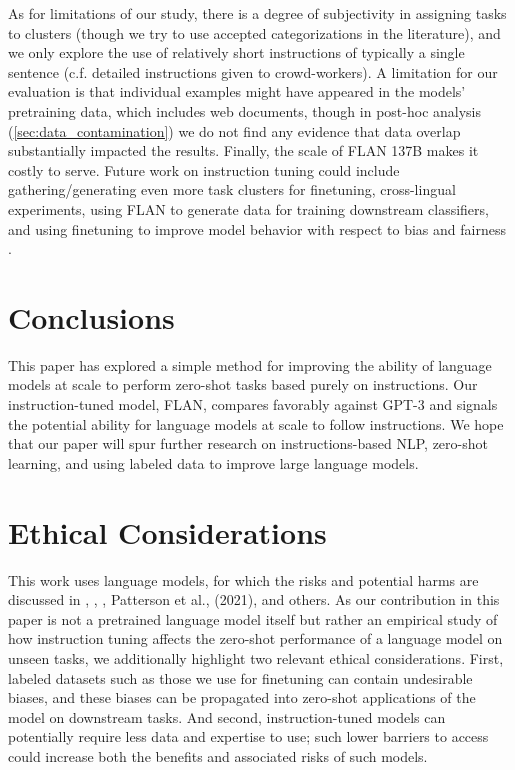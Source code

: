 \documentclass{article} \usepackage{iclr2022_conference,times}
\newcommand{\flan}{FLAN}
\begin{document}
As for limitations of our study, there is a degree of subjectivity in assigning tasks to clusters (though we try to use accepted categorizations in the literature), and we only explore the use of relatively short instructions of typically a single sentence (c.f. detailed instructions given to crowd-workers). 
A limitation for our evaluation is that individual examples might have appeared in the models’ pretraining data, which includes web documents, though in post-hoc analysis (\cref{sec:data_contamination}) we do not find any evidence that data overlap substantially impacted the results.
Finally, the scale of \flan{} 137B makes it costly to serve.
Future work on instruction tuning could include gathering/generating even more task clusters for finetuning, 
cross-lingual experiments, 
using \flan{} to generate data for training downstream classifiers, 
and using finetuning to improve model behavior with respect to bias and fairness \citep{solaiman2021process}. 

\section{Conclusions}
This paper has explored a simple method for improving the ability of language models at scale to perform zero-shot tasks based purely on instructions.
Our instruction-tuned model, \flan{}, compares favorably against GPT-3 and signals the potential ability for language models at scale to follow instructions.
We hope that our paper will spur further research on instructions-based NLP, zero-shot learning, and using labeled data to improve large language models. 









\clearpage

\section*{Ethical Considerations}
This work uses language models, for which the risks and potential harms are discussed in \citet{bender-koller-2020-climbing}, \citet{brown2020language}, \citet{10.1145/3442188.3445922}, Patterson et al., (2021), and others. As our contribution in this paper is not a pretrained language model itself but rather an empirical study of how instruction tuning affects the zero-shot performance of a language model on unseen tasks, we additionally highlight two relevant ethical considerations. First, labeled datasets such as those we use for finetuning can contain undesirable biases, and these biases can be propagated into zero-shot applications of the model on downstream tasks.  And second, instruction-tuned models can potentially require less data and expertise to use; such lower barriers to access could increase both the benefits and associated risks of such models.
\end{document}
